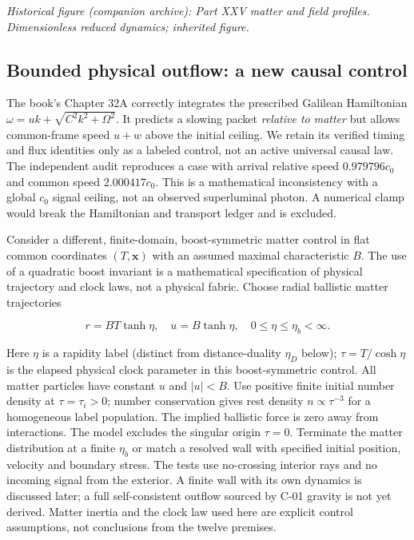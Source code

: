 \documentclass[
  11pt,
  twoside]{article}
\begin{document}
\emph{Historical figure (companion archive): Part XXV matter and field
profiles. Dimensionless reduced dynamics; inherited figure.}

\subsection{Bounded physical outflow: a new causal
control}\label{bounded-physical-outflow-a-new-causal-control}

The book's Chapter 32A correctly integrates the prescribed Galilean
Hamiltonian \(\omega=u k+\sqrt{C^2k^2+\Omega^2}\). It predicts a slowing
packet \emph{relative to matter} but allows common-frame speed \(u+w\)
above the initial ceiling. We retain its verified timing and flux
identities only as a labeled control, not an active universal causal
law. The independent audit reproduces a case with arrival relative speed
\(0.979796c_0\) and common speed \(2.000417c_0\). This is a mathematical
inconsistency with a global \(c_0\) signal ceiling, not an observed
superluminal photon. A numerical clamp would break the Hamiltonian and
transport ledger and is excluded.

Consider a different, finite-domain, boost-symmetric matter control in
flat common coordinates \((T,\mathbf{x})\) with an assumed maximal
characteristic \(B\). The use of a quadratic boost invariant is a
mathematical specification of physical trajectory and clock laws, not a
physical fabric. Choose radial ballistic matter trajectories

\[r=B T\tanh\eta,\quad u=B\tanh\eta,\quad 0\leq\eta\leq\eta_b<\infty.\tag{R1}\]

Here \(\eta\) is a rapidity label (distinct from distance-duality
\(\eta_D\) below); \(\tau=T/\cosh\eta\) is the elapsed physical clock
parameter in this boost-symmetric control. All matter particles have
constant \(u\) and \(|u|<B\). Use positive finite initial number density
at \(\tau=\tau_i>0\); number conservation gives rest density
\(n\propto\tau^{-3}\) for a homogeneous label population. The implied
ballistic force is zero away from interactions. The model excludes the
singular origin \(\tau=0\). Terminate the matter distribution at a
finite \(\eta_b\) or match a resolved wall with specified initial
position, velocity and boundary stress. The tests use no-crossing
interior rays and no incoming signal from the exterior. A finite wall
with its own dynamics is discussed later; a full self-consistent outflow
sourced by C-01 gravity is not yet derived. Matter inertia and the clock
law used here are explicit control assumptions, not conclusions from the
twelve premises.
\end{document}
